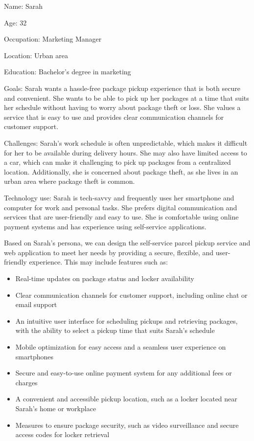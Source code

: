 \documentclass{article}
\begin{document}
Name: Sarah

Age: 32

Occupation: Marketing Manager

Location: Urban area

Education: Bachelor's degree in marketing

Goals: Sarah wants a hassle-free package pickup experience that is both secure and convenient. She wants to be able to pick up her packages at a time that suits her schedule without having to worry about package theft or loss. She values a service that is easy to use and provides clear communication channels for customer support.

Challenges: Sarah's work schedule is often unpredictable, which makes it difficult for her to be available during delivery hours. She may also have limited access to a car, which can make it challenging to pick up packages from a centralized location. Additionally, she is concerned about package theft, as she lives in an urban area where package theft is common.

Technology use: Sarah is tech-savvy and frequently uses her smartphone and computer for work and personal tasks. She prefers digital communication and services that are user-friendly and easy to use. She is comfortable using online payment systems and has experience using self-service applications.

Based on Sarah's persona, we can design the self-service parcel pickup service and web application to meet her needs by providing a secure, flexible, and user-friendly experience. This may include features such as:
\begin{itemize}
    \item Real-time updates on package status and locker availability
    \item Clear communication channels for customer support, including online chat or email support
    \item An intuitive user interface for scheduling pickups and retrieving packages, with the ability to select a pickup time that suits Sarah's schedule
    \item Mobile optimization for easy access and a seamless user experience on smartphones
    \item Secure and easy-to-use online payment system for any additional fees or charges
    \item A convenient and accessible pickup location, such as a locker located near Sarah's home or workplace
    \item Measures to ensure package security, such as video surveillance and secure access codes for locker retrieval
\end{itemize}
\end{document}
